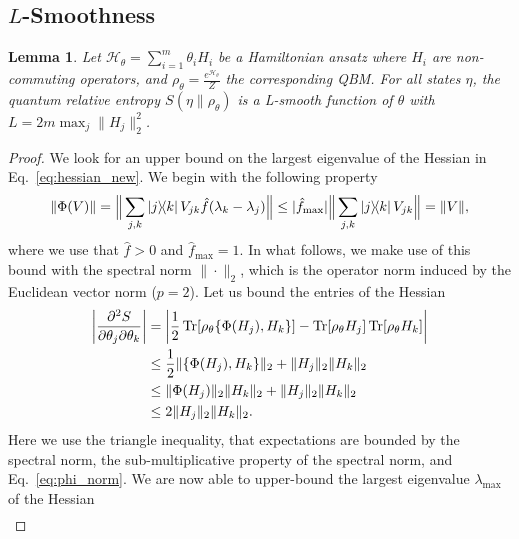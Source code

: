 \documentclass[
    reprint,
    aps,
    prx,
    longbibliography
]{revtex4-2}
\newtheorem{lemma}{Lemma}
\begin{document}
\subsection*{\texorpdfstring{$L$}{L}-Smoothness}

\begin{lemma}
Let $\mathcal{H}_\theta = \sum_{i=1}^m \theta_{i} H_{i}$ be a Hamiltonian ansatz where $H_i$ are non-commuting operators, and $\rho_\theta = \frac{e^{\mathcal{H}_\theta}}{Z}$ the corresponding QBM. For all states $\eta$, the quantum relative entropy $S(\eta\|\rho_\theta)$ is a L-smooth function of $\theta$ with $L=2m \max_j \| H_j \|_2^2$. 
\end{lemma}

\begin{proof}
We look for an upper bound on the largest eigenvalue of the Hessian in Eq.~\eqref{eq:hessian_new}. 
We begin with the following property
\begin{align}
\label{eq:phi_norm}
    \| \Phi(V) \| = \Big \| \sum_{j,k} \ketbra{j}{k} V_{jk} \hat{f}(\lambda_k - \lambda_j) \Big \| \leq | \hat{f}_{\max} | \Big \| \sum_{j,k} \ketbra{j}{k} V_{jk} \Big \| = \| V \| ,
\end{align}
where we use that $\hat{f}>0$ and $\hat{f}_{\max} = 1$. In what follows, we make use of this bound with the spectral norm $\| \cdot \|_2$, which is the operator norm induced by the Euclidean vector norm ($p=2$). 
Let us bound the entries of the Hessian
\begin{align}
\begin{split}
    \left| \frac{\partial^2 S}{\partial \theta_{j} \partial \theta_{k}} \right| &= \left | \frac{1}{2} \Tr[ \rho_\theta \{ \Phi(H_j), H_k \}] - \Tr[ \rho_\theta H_j] \Tr[ \rho_\theta H_k] \right| \\
    &\leq \frac{1}{2} \| \{\Phi(H_j), H_k\} \|_2 +  \| H_j \|_2 \| H_k \|_2 \\ 
    &\leq \| \Phi(H_j) \|_2 \| H_k \|_2 +  \| H_j \|_2 \| H_k \|_2 \\ 
    &\leq 2 \| H_j \|_2 \| H_k \|_2 .
\end{split}
\end{align}
Here we use the triangle inequality, that expectations are bounded by the spectral norm, the sub-multiplicative property of the spectral norm, and Eq.~\eqref{eq:phi_norm}. We are now able to upper-bound the largest eigenvalue $\lambda_\mathrm{max}$ of the Hessian
\begin{align}

\end{align}
\end{proof}
\end{document}
